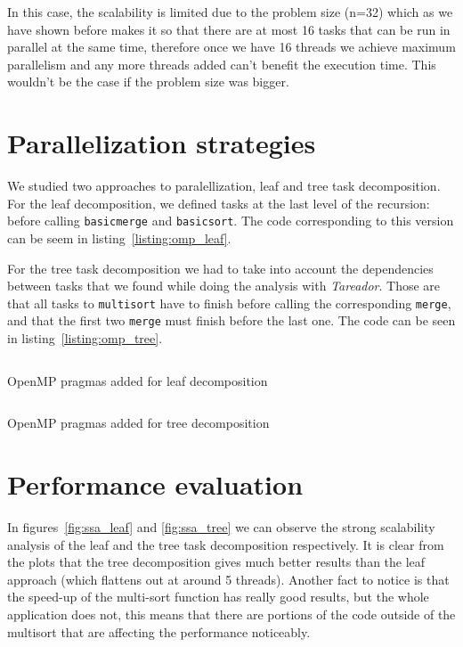 In this case, the scalability is limited due to the problem size (n=32) which as we have shown before makes it so that
there are at most 16 tasks that can be run in parallel at the same time, therefore once we have 16 threads we achieve maximum parallelism and any more threads added can't benefit the execution time. This wouldn't be the case if
the problem size was bigger.

\section{Parallelization strategies}%
\label{sec:par_strats}

We studied two approaches to paralellization, leaf and tree task decomposition. For the leaf decomposition, we
defined tasks at the last level of the recursion: before calling \texttt{basicmerge} and \texttt{basicsort}. The
code corresponding to this version can be seem in listing~\ref{listing:omp_leaf}. 

For the tree task decomposition
we had to take into account the dependencies between tasks that we found while doing the analysis with \emph{Tareador}. Those are that all tasks to \texttt{multisort} have to finish before calling the corresponding
\texttt{merge}, and that the first two \texttt{merge} must finish before the last one. The code can be seen in
listing~\ref{listing:omp_tree}.

\begin{listing}[H]
\inputminted[firstline=32,lastline=63]{c}{sources/multisort-omp-leaf.c}
\caption{OpenMP pragmas added for leaf decomposition}
\label{listing:omp_leaf}
\end{listing}

\begin{listing}[H]
\inputminted[firstline=32,lastline=74]{c}{sources/multisort-omp-tree.c}
\caption{OpenMP pragmas added for tree decomposition}
\label{listing:omp_tree}
\end{listing}

\section{Performance evaluation}%
\label{sec:perf_eval}

In figures~\ref{fig:ssa_leaf} and \ref{fig:ssa_tree} we can observe the strong scalability analysis
of the leaf and the tree task decomposition respectively. It is clear from the plots that the
tree decomposition gives much better results than the leaf approach (which flattens out at around 5 threads).
Another fact to notice is that the speed-up of the multi-sort function has really good results, but the
whole application does not, this means that there are portions of the code outside of the multisort that are
affecting the performance noticeably.

